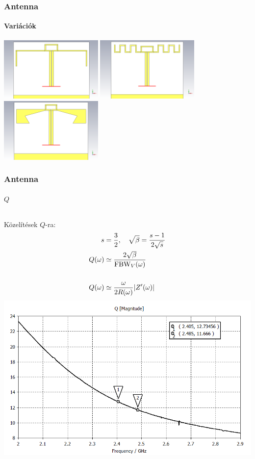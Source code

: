\documentclass[aspectratio=169]{beamer}
\begin{document}
\begin{frame}
	\frametitle{Antenna}
	\framesubtitle{Variációk}
		\centering
		\includegraphics[width=0.38\textwidth]{bifa_3D.png}
		\includegraphics[width=0.38\textwidth]{bifa_meandered_3D.png}
		\includegraphics[width=0.38\textwidth]{bifa_broadband_3D.png}
\end{frame}
\begin{frame}
	\frametitle{Antenna}
	\framesubtitle{$Q$}
	\begin{columns}
			Közelítések $Q$-ra:\\
			\begin{align*}
				s & = \frac{3}{2}, \quad \sqrt{\beta} = \frac{s-1}{2\sqrt{s}} \\
				Q(\omega) & \simeq \frac{2 \sqrt{\beta}}{\text{FBW}_V(\omega)} \\
				\vspace{\fill}\\
				Q(\omega) & \simeq \frac{\omega}{2 R(\omega)}|Z'(\omega)|
			\end{align*}
			\includegraphics[width=\textwidth]{bifa_broadband_QZ.png}
	\end{columns}
\end{frame}
\end{document}
